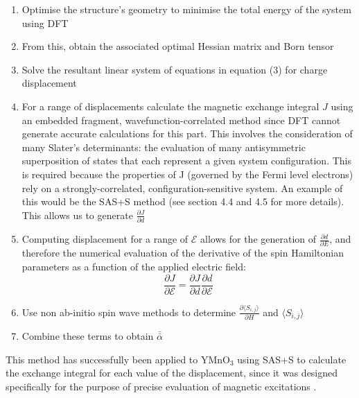 \documentclass[10pt]{article}
\begin{document}
\begin{enumerate}
	\item Optimise the structure's geometry to minimise the total energy of the system using DFT
	\item From this, obtain the associated optimal Hessian matrix and Born tensor
	\item Solve the resultant linear system of equations in equation (3) for charge displacement
	\item For a range of displacements calculate the magnetic exchange integral $J$ using an embedded fragment, wavefunction-correlated method since DFT cannot generate accurate calculations for this part. This involves the consideration of many Slater's determinants: the evaluation of many antisymmetric superposition of states that each represent a given system configuration. This is required because the properties of J (governed by the Fermi level electrons) rely on a strongly-correlated, configuration-sensitive system. An example of this would be the SAS+S method (see section 4.4 and 4.5 for more details). This allows us to generate $\frac{\partial J}{\partial d}$
	\item Computing displacement for a range of $\mathcal{E}$ allows for the generation of $\frac{\partial d}{\partial E}$, and therefore the numerical evaluation of the derivative of the spin Hamiltonian parameters as a function of the applied electric field:
	\begin{equation*}
	\dfrac{\partial J}{\partial \mathcal{E}} = \dfrac{\partial J}{\partial d}\dfrac{\partial d}{\partial \mathcal{E}}
	\end{equation*}
	\item Use non ab-initio spin wave methods to determine $\frac{\partial\langle S_{i,j}\rangle}{\partial H}$ and $\langle S_{i,j}\rangle$
	\item Combine these terms to obtain $\bar{\bar{\alpha}}$
\end{enumerate}

This method has successfully been applied to YMnO$_3$ using SAS+S to calculate the exchange integral for each value of the displacement, since it was designed specifically for the purpose of precise evaluation of magnetic excitations \cite{varignon2013ab}.
\end{document}
